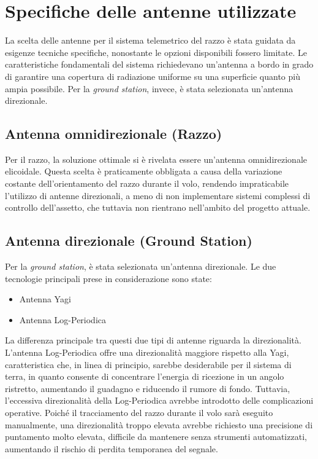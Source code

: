\documentclass[12pt,a4paper,twoside]{book}
\begin{document}
\section{Specifiche delle antenne utilizzate} \label{sec:antennas}
La scelta delle antenne per il sistema telemetrico del razzo è stata guidata da
esigenze tecniche specifiche, nonostante le opzioni disponibili fossero limitate.
Le caratteristiche fondamentali del sistema richiedevano un'antenna a bordo in
grado di garantire una copertura di radiazione uniforme su una superficie quanto
più ampia possibile. Per la \emph{ground station}, invece, è stata selezionata
un'antenna direzionale.

\subsection*{Antenna omnidirezionale (Razzo)}

Per il razzo, la soluzione ottimale si è rivelata essere un'antenna omnidirezionale
elicoidale.
Questa scelta è praticamente obbligata a causa della variazione costante dell'orientamento
del razzo durante il volo, rendendo impraticabile l'utilizzo di antenne direzionali,
a meno di non implementare sistemi complessi di controllo dell'assetto, che
tuttavia non rientrano nell'ambito del progetto attuale.

\subsection*{Antenna direzionale (Ground Station)}

Per la \emph{ground station}, è stata selezionata un'antenna direzionale. Le due
tecnologie principali prese in considerazione sono state:
\begin{itemize}
    \item Antenna Yagi
    \item Antenna Log-Periodica
\end{itemize}

La differenza principale tra questi due tipi di antenne riguarda la direzionalità.
L'antenna Log-Periodica offre una direzionalità maggiore rispetto alla Yagi,
caratteristica che, in linea di principio, sarebbe desiderabile per il sistema
di terra, in quanto consente di concentrare l'energia di ricezione in un angolo
ristretto, aumentando il guadagno e riducendo il rumore di fondo.
Tuttavia, l'eccessiva direzionalità della Log-Periodica avrebbe introdotto
delle complicazioni operative. Poiché il tracciamento del razzo durante il volo
sarà eseguito manualmente, una direzionalità troppo elevata avrebbe richiesto
una precisione di puntamento molto elevata, difficile da mantenere senza
strumenti automatizzati, aumentando il rischio di perdita temporanea del segnale.
\end{document}
